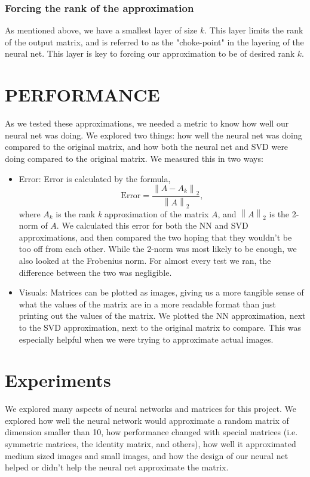 \documentclass[a4paper,twoside]{article}
\newcommand{\norm}[1]{\left\lVert#1\right\rVert}
\begin{document}
\subsubsection{Forcing the rank of the approximation}
\label{sec:force_rank}
\noindent As mentioned above, we have a smallest layer of size $k$. This layer limits the rank of the output matrix, and is referred to as the "choke-point" in the layering of the neural net. This layer is key to forcing our approximation to be of desired rank $k$.

\section{\uppercase{Performance}}
\label{sec:performance}
\noindent As we tested these approximations, we needed a metric to know how well our neural net was doing. We explored two things: how well the neural net was doing compared to the original matrix, and how both the neural net and SVD were doing compared to the original matrix. We measured this in two ways:

\begin{itemize}
    \item Error: Error is calculated by the formula, $$\text{Error} = \frac{\norm{A-A_k}_2}{\norm{A}_2},$$ where $A_k$ is the rank \textit{k} approximation of the matrix $A$, and $\norm{A}_2$ is the 2-norm of $A$. We calculated this error for both the NN and SVD approximations, and then compared the two hoping that they wouldn't be too off from each other. While the 2-norm was most likely to be enough, we also looked at the Frobenius norm. For almost every test we ran, the difference between the two was negligible.
    \item Visuals: Matrices can be plotted as images, giving us a more tangible sense of what the values of the matrix are in a more readable format than just printing out the values of the matrix. We plotted the NN approximation, next to the SVD approximation, next to the original matrix to compare. This was especially helpful when we were trying to approximate actual images.
\end{itemize}

\section{Experiments}
\label{sec:results}
\noindent We explored many aspects of neural networks and matrices for this project. We explored how well the neural network would approximate a random matrix of dimension smaller than 10, how performance changed with special matrices (i.e. symmetric matrices, the identity matrix, and others), how well it approximated medium sized images and small images, and how the design of our neural net helped or didn't help the neural net approximate the matrix.
\end{document}
